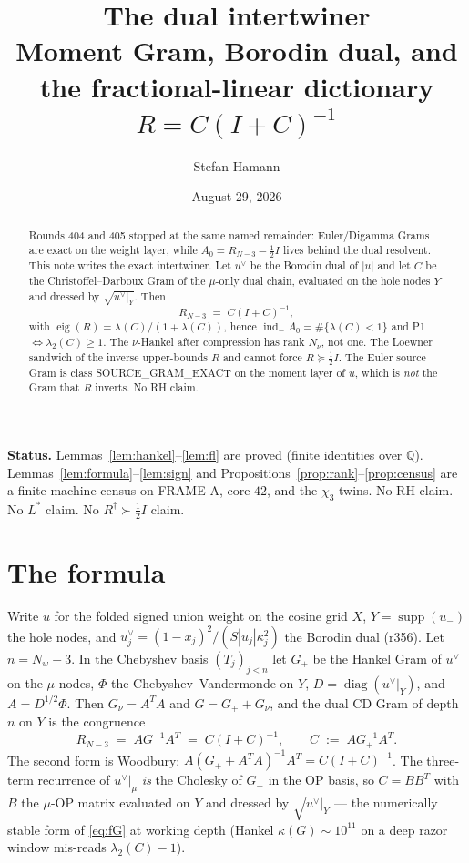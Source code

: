\documentclass[11pt]{article}
\title{\bfseries The dual intertwiner\\[2mm]
\large Moment Gram, Borodin dual, and the fractional-linear
dictionary $R=C(I+C)^{-1}$}
\author{Stefan Hamann}
\date{August 29, 2026}
\theoremstyle{remark}
\newcommand{\indm}{\operatorname{ind}_{-}}
\newcommand{\half}{\tfrac12}
\begin{document}
\maketitle

\begin{abstract}\noindent
Rounds 404 and 405 stopped at the same named remainder:
Euler/Digamma Grams are exact on the weight layer, while
$A_0=R_{N-3}-\half I$ lives behind the dual resolvent.
This note writes the exact intertwiner.
Let $u^\vee$ be the Borodin dual of $|u|$ and let $C$ be the
Christoffel--Darboux Gram of the $\mu$-only dual chain,
evaluated on the hole nodes $Y$ and dressed by
$\sqrt{u^\vee|_Y}$.
Then
\[
  R_{N-3}\;=\;C(I+C)^{-1},
\]
with $\operatorname{eig}(R)=\lambda(C)/(1+\lambda(C))$, hence
$\indm A_0=\#\{\lambda(C)<1\}$ and P1 $\iff\lambda_2(C)\ge 1$.
The $\nu$-Hankel after compression has rank $N_\nu$, not one.
The Loewner sandwich of the inverse upper-bounds $R$ and
cannot force $R\succeq\half I$.
The Euler source Gram is class SOURCE\_GRAM\_EXACT on the
moment layer of $u$, which is \emph{not} the Gram that $R$
inverts.
No RH claim.
\end{abstract}

\medskip\noindent
\textbf{Status.}\enspace
Lemmas~\ref{lem:hankel}--\ref{lem:fl} are proved (finite
identities over $\mathbb{Q}$).
Lemmas~\ref{lem:formula}--\ref{lem:sign} and
Propositions~\ref{prop:rank}--\ref{prop:census} are a finite
machine census on FRAME-A, core-$42$, and the $\chi_3$ twins.
No RH claim.  No $L^*$ claim.  No $R^\dagger\succ\half I$ claim.

\section{The formula}\label{sec:formula}

Write $u$ for the folded signed union weight on the cosine
grid $X$, $Y=\operatorname{supp}(u_-)$ the hole nodes, and
$u^\vee_j=(1-x_j)^2/(S|u_j|\kappa_j^2)$ the Borodin dual
(r356).
Let $n=N_w-3$.
In the Chebyshev basis $(T_j)_{j<n}$ let $G_+$ be the Hankel
Gram of $u^\vee$ on the $\mu$-nodes, $\Phi$ the
Chebyshev--Vandermonde on $Y$, $D=\operatorname{diag}(u^\vee|_Y)$,
and $A=D^{1/2}\Phi$.
Then $G_\nu=A^TA$ and $G=G_++G_\nu$, and the dual CD Gram of
depth $n$ on $Y$ is the congruence
\begin{equation}\label{eq:fG}
  R_{N-3}
  \;=\;
  A G^{-1} A^T
  \;=\;
  C(I+C)^{-1},
  \qquad
  C\;:=\;A G_+^{-1} A^T.
\end{equation}
The second form is Woodbury:
$A(G_++A^TA)^{-1}A^T=C(I+C)^{-1}$.
The three-term recurrence of $u^\vee|_\mu$ \emph{is} the
Cholesky of $G_+$ in the OP basis, so $C=BB^T$ with $B$ the
$\mu$-OP matrix evaluated on $Y$ and dressed by
$\sqrt{u^\vee|_Y}$ --- the numerically stable form of
\eqref{eq:fG} at working depth (Hankel $\kappa(G)\sim 10^{11}$
on a deep razor window mis-reads $\lambda_2(C)-1$).
\end{document}

